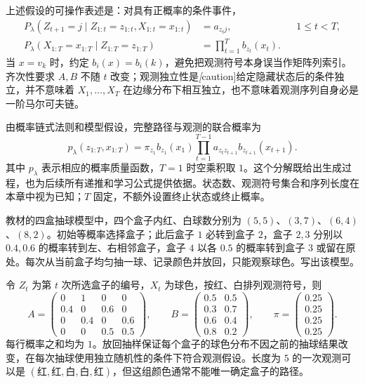 上述假设的可操作表述是：对具有正概率的条件事件，
\begin{align}
\label{eq:lh-hmm-markov}
 P_\lambda(Z_{t+1}=j\mid Z_{1:t}=z_{1:t},X_{1:t}=x_{1:t})&=a_{z_tj},
 &&1\leq t<T,\\
\label{eq:lh-hmm-emission}
 P_\lambda(X_{1:T}=x_{1:T}\mid Z_{1:T}=z_{1:T})&=\prod_{t=1}^T b_{z_t}(x_t).
\end{align}
当 $x=v_k$ 时，约定 $b_i(x)=b_i(k)$，避免把观测符号本身误当作矩阵列索引。齐次性要求 $A,B$ 不随 $t$ 改变；观测独立性是\emph[caution]{给定隐藏状态后的条件独立}，并不意味着 $X_1,\ldots,X_T$ 在边缘分布下相互独立，也不意味着观测序列自身必是一阶马尔可夫链。

由概率链式法则和模型假设，完整路径与观测的联合概率为
\begin{equation}
\label{eq:lh-hmm-joint}
 p_\lambda(z_{1:T},x_{1:T})
 =\pi_{z_1}b_{z_1}(x_1)\prod_{t=1}^{T-1}a_{z_tz_{t+1}}b_{z_{t+1}}(x_{t+1}).
\end{equation}
其中 $p_\lambda$ 表示相应的概率质量函数，$T=1$ 时空乘积取 $1$。这个分解既给出生成过程，也为后续所有递推和学习公式提供依据。状态数、观测符号集合和序列长度在本章中视为已知；$T$ 固定，不额外设置终止状态或终止概率。

\begin{example}
\label{ex:lh-hmm-four-boxes}
教材的四盒抽球模型中，四个盒子内红、白球数分别为 $(5,5)$、$(3,7)$、$(6,4)$、$(8,2)$。初始等概率选择盒子；此后盒子 $1$ 必转到盒子 $2$，盒子 $2,3$ 分别以 $0.4,0.6$ 的概率转到左、右相邻盒子，盒子 $4$ 以各 $0.5$ 的概率转到盒子 $3$ 或留在原处。每次从当前盒子均匀抽一球、记录颜色并放回，只能观察球色。写出该模型。
\end{example}
\begin{solve}
令 $Z_t$ 为第 $t$ 次所选盒子的编号，$X_t$ 为球色，按红、白排列观测符号，则
\[
 A=\begin{pmatrix}
 0&1&0&0\\
 0.4&0&0.6&0\\
 0&0.4&0&0.6\\
 0&0&0.5&0.5
 \end{pmatrix},\qquad
 B=\begin{pmatrix}
 0.5&0.5\\0.3&0.7\\0.6&0.4\\0.8&0.2
 \end{pmatrix},\qquad
 \pi=\begin{pmatrix}0.25\\0.25\\0.25\\0.25\end{pmatrix}.
\]
每行概率之和均为 $1$。放回抽样保证每个盒子的球色分布不因之前的抽球结果改变，在每次抽球使用独立随机性的条件下符合观测假设。长度为 $5$ 的一次观测可以是 $(\text{红},\text{红},\text{白},\text{白},\text{红})$，但这组颜色通常不能唯一确定盒子的路径。
\end{solve}


